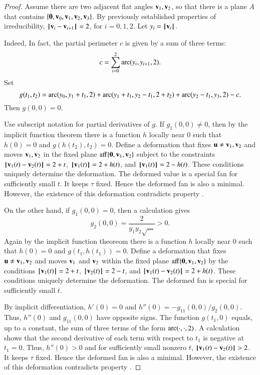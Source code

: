\begin{proof}
Assume there are two adjacent flat angles ${\mathbf v}_1,{\mathbf v}_2$, so that there is a plane $A$ that contains $\{{\mathbf 0},{\mathbf v}_0,{\mathbf v}_1,{\mathbf v}_2,{\mathbf v}_3\}$.
By previously established properties of irreducibility,
%
${\hskip0.1em|\hskip-0.15em|\hskip0.1em}{\mathbf v}_i - {\mathbf v}_{i+1}{\hskip0.1em|\hskip-0.15em|\hskip0.1em}=2$, for $i=0,1,2$.
Let $y_i = {{\hskip0.1em|\hskip-0.15em|\hskip0.1em}{\mathbf v}_i{\hskip0.1em|\hskip-0.15em|\hskip0.1em}}$.
%

  Indeed,
In fact, the partial perimeter $c$ is given by a sum of three terms:
  $$
  c=\sum_{i=0}^2\operatorname{arc}(y_i,y_{i+1},2).
  $$
Set
$$
g(t_1,t_2) = \operatorname{arc}(y_0,y_1+t_1,2) + \operatorname{arc}(y_1+t_1,y_2-t_1,2+t_2) + \operatorname{arc}(y_2-t_1,y_3,2) - c.
$$
Then $g(0,0)=0$.  

Use subscript notation for partial derivatives of $g$.  If $g_1(0,0) \ne 0$, then by the implicit function theorem there is a function $h$ locally near $0$ such that $h(0)=0$ and $g(h(t_2),t_2)=0$.  Define a deformation that fixes ${\mathbf u}\ne{\mathbf v}_1,{\mathbf v}_2$ and moves ${\mathbf v}_1,{\mathbf v}_2$ in the fixed plane ${\operatorname{aff}}\{{\mathbf 0},{\mathbf v}_1,{\mathbf v}_2\}$ subject to the constraints ${\hskip0.1em|\hskip-0.15em|\hskip0.1em}{\mathbf v}_1(t) - {\mathbf v}_2(t){\hskip0.1em|\hskip-0.15em|\hskip0.1em}=2+t$, ${{\hskip0.1em|\hskip-0.15em|\hskip0.1em}{\mathbf v}_1(t){\hskip0.1em|\hskip-0.15em|\hskip0.1em}} = 2+h(t)$, and ${{\hskip0.1em|\hskip-0.15em|\hskip0.1em}{\mathbf v}_1(t){\hskip0.1em|\hskip-0.15em|\hskip0.1em}} = 2-h(t)$.  These conditions uniquely determine the deformation.  The deformed value is a special fan for sufficiently small $t$.  It keeps $\tau$ fixed.  Hence the deformed fan is also a minimal.  However, the existence of this deformation contradicts property .

On the other hand, if $ g_1(0,0) =0$, then a calculation gives
$$g_2(0,0) = \dfrac{2}{y_1y_2\sqrt{\ldots}} > 0.$$
Again by the implicit function theoreom there is a function $h$ locally near $0$ such that $h(0)=0$ and $g(t_1,h(t_1))=0$.   Define a deformation that fixes ${\mathbf u}\ne {\mathbf v}_1,{\mathbf v}_2$ and moves ${\mathbf v}_1$ and ${\mathbf v}_2$ within the fixed plane ${\operatorname{aff}}\{{\mathbf 0},{\mathbf v}_1,{\mathbf v}_2\}$ by the conditions ${{\hskip0.1em|\hskip-0.15em|\hskip0.1em}{\mathbf v}_1(t){\hskip0.1em|\hskip-0.15em|\hskip0.1em}} = 2 + t$, ${{\hskip0.1em|\hskip-0.15em|\hskip0.1em}{\mathbf v}_2(t){\hskip0.1em|\hskip-0.15em|\hskip0.1em}} = 2 - t$, and ${\hskip0.1em|\hskip-0.15em|\hskip0.1em}{\mathbf v}_1(t) - {\mathbf v}_2(t){\hskip0.1em|\hskip-0.15em|\hskip0.1em}=2+h(t)$.  These conditions uniquely determine the deformation.  The deformed fan is special for sufficiently small $t$.  

By implicit differentiation,  $h'(0) = 0$ and 
$h''(0) = -g_{11}(0,0)/g_2(0,0)$.  Thus, $h''(0)$ and $g_{11}(0,0)$ have opposite signs.
The function $g(t_1,0)$ equals, up to a constant, the sum of three terms of the form
$\operatorname{arc}(\cdot,\cdot,2)$.
A calculation shows that the second derivative of each term with respect to $t_1$ is negative at $t_1=0$.
Thus, $h''(0)>0$ and for sufficiently small nonzero $t$, 
${\hskip0.1em|\hskip-0.15em|\hskip0.1em}{\mathbf v}_1(t) - {\mathbf v}_2(t){\hskip0.1em|\hskip-0.15em|\hskip0.1em}>2$.
It keeps $\tau$ fixed.  Hence the deformed fan is also a minimal.  However, the existence of this deformation contradicts property .
\end{proof}







